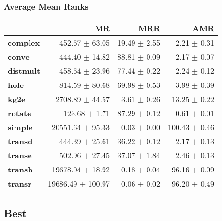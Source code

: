 \documentclass{article}
\begin{document}
    \subsubsection{Average Mean Ranks}
    \begin{center}
    \begin{tabular}{lrrr}
\toprule
{} &                 MR &           MRR &            AMR \\
\midrule
\textbf{complex } &     452.67 $\pm$ 63.05 &  19.49 $\pm$ 2.55 &    2.21 $\pm$ 0.31 \\
\textbf{conve   } &     444.40 $\pm$ 14.82 &  88.81 $\pm$ 0.09 &    2.17 $\pm$ 0.07 \\
\textbf{distmult} &     458.64 $\pm$ 23.96 &  77.44 $\pm$ 0.22 &    2.24 $\pm$ 0.12 \\
\textbf{hole    } &     814.59 $\pm$ 80.68 &  69.98 $\pm$ 0.53 &    3.98 $\pm$ 0.39 \\
\textbf{kg2e    } &    2708.89 $\pm$ 44.57 &   3.61 $\pm$ 0.26 &   13.25 $\pm$ 0.22 \\
\textbf{rotate  } &      123.68 $\pm$ 1.71 &  87.29 $\pm$ 0.12 &    0.61 $\pm$ 0.01 \\
\textbf{simple  } &   20551.64 $\pm$ 95.33 &   0.03 $\pm$ 0.00 &  100.43 $\pm$ 0.46 \\
\textbf{transd  } &     444.39 $\pm$ 25.61 &  36.22 $\pm$ 0.12 &    2.17 $\pm$ 0.13 \\
\textbf{transe  } &     502.96 $\pm$ 27.45 &  37.07 $\pm$ 1.84 &    2.46 $\pm$ 0.13 \\
\textbf{transh  } &   19678.04 $\pm$ 18.92 &   0.18 $\pm$ 0.04 &   96.16 $\pm$ 0.09 \\
\textbf{transr  } &  19686.49 $\pm$ 100.97 &   0.06 $\pm$ 0.02 &   96.20 $\pm$ 0.49 \\
\bottomrule
\end{tabular}

    \end{center}
    \subsection{Best}
\end{document}
